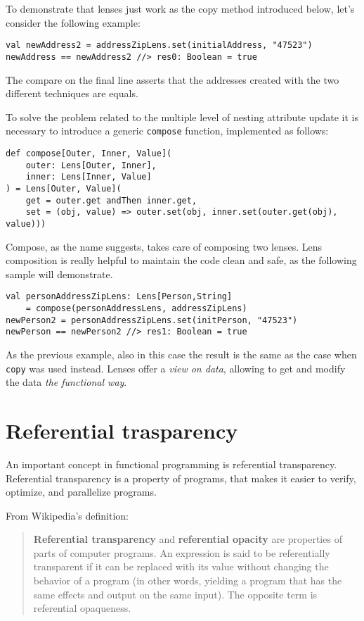 To demonstrate that lenses just work as the copy method introduced below,
let's consider the following example:

\begin{verbatim}
val newAddress2 = addressZipLens.set(initialAddress, "47523")
newAddress == newAddress2 //> res0: Boolean = true
\end{verbatim}

The compare on the final line asserts that the addresses created with
the two different techniques are equals.

To solve the problem related to the multiple level of nesting attribute
update it is necessary to introduce a generic \texttt{compose} function,
implemented as follows:

\begin{verbatim}
def compose[Outer, Inner, Value](
    outer: Lens[Outer, Inner],
    inner: Lens[Inner, Value]
) = Lens[Outer, Value](
    get = outer.get andThen inner.get,
    set = (obj, value) => outer.set(obj, inner.set(outer.get(obj), value)))
\end{verbatim}

Compose, as the name suggests, takes care of composing two lenses. Lens
composition is really helpful to maintain the code clean and safe, as the
following sample will demonstrate.

\begin{verbatim}
val personAddressZipLens: Lens[Person,String] 
	= compose(personAddressLens, addressZipLens)
newPerson2 = personAddressZipLens.set(initPerson, "47523")
newPerson == newPerson2 //> res1: Boolean = true
\end{verbatim}

As the previous example, also in this case the result is the same as the
case when \texttt{copy} was used instead. Lenses offer a \emph{view on
data}, allowing to get and modify the data \emph{the functional way}.

\section{Referential trasparency}\label{referential-trasparency}

An important concept in functional programming is referential
transparency. Referential transparency is a property of programs, that
makes it easier to verify, optimize, and parallelize programs.

From Wikipedia's definition:

\begin{quote}
\textbf{Referential transparency} and \textbf{referential opacity} are
properties of parts of computer programs. An expression is said to be
referentially transparent if it can be replaced with its value without
changing the behavior of a program (in other words, yielding a program
that has the same effects and output on the same input). The opposite
term is referential opaqueness.
\end{quote}

